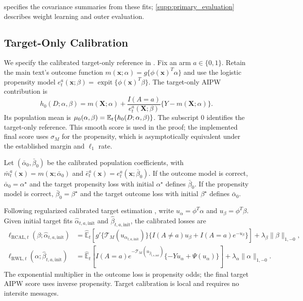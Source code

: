 \documentclass[12pt]{article}
\providecommand{\En}{\widehat{\mathbb E}}
\begin{document}
 specifies the covariance summaries from these fits; \cref{supp:primary_evaluation} describes weight learning and outer evaluation.

\subsection{Target-Only Calibration}\label{supp:target_only_anchor}

We specify the calibrated target-only reference in . Fix an arm $a\in\{0,1\}$. Retain the main text's outcome function $m(\boldsymbol x;\alpha)=g\{\phi(\boldsymbol x)^T\alpha\}$ and use the logistic propensity model $e_t^a(\boldsymbol x;\beta)=\operatorname{expit}\{\phi(\boldsymbol x)^T\beta\}$.
The target-only AIPW contribution is
\[
h_0(D;\alpha,\beta)
=m(\boldsymbol X;\alpha)+\frac{I(A=a)}{e_t^a(\boldsymbol X;\beta)}
\{Y-m(\boldsymbol X;\alpha)\}.
\]
Its population mean is $\mu_0(\alpha,\beta)=\mathbb{E}_t\{h_0(D;\alpha,\beta)\}$. The subscript $0$ identifies the target-only reference. This smooth score is used in the proof; the implemented final score uses $\sigma_M$ for the propensity, which is asymptotically equivalent under the established margin and $\ell_1$ rate.

Let $(\bar\alpha_0,\bar\beta_0)$ be the calibrated population coefficients, with $\bar m_t^a(\boldsymbol x)=m(\boldsymbol x;\bar\alpha_0)$ and $\bar e_t^a(\boldsymbol x)=e_t^a(\boldsymbol x;\bar\beta_0)$. If the outcome model is correct, $\bar\alpha_0=\alpha^\star$ and the target propensity loss with initial $\alpha^\star$ defines $\bar\beta_0$. If the propensity model is correct, $\bar\beta_0=\beta^\star$ and the target outcome loss with initial $\beta^\star$ defines $\bar\alpha_0$.

Following regularized calibrated target estimation \citep{tan2020model,smucler2019unifying,hou2025efficient}, write $u_\alpha=\phi^T\alpha$ and $u_\beta=\phi^T\beta$. Given initial target fits $\widehat\alpha_{t,a,\mathrm{init}}$ and $\widehat\beta_{t,a,\mathrm{init}}$, the calibrated losses are
\begin{equation}\label{eq:target_calibrated_losses}
\begin{aligned}
\ell_{\mathrm{RCAL},t}(\beta;\widehat\alpha_{t,a,\mathrm{init}})
&=\En_t\left[g'\{\mathcal T_M(u_{\widehat\alpha_{t,a,\mathrm{init}}})\}
\{I(A\ne a)u_\beta+I(A=a) e^{-u_\beta}\}\right]
+\lambda_\beta\|\beta\|_{1,-0},\\
\ell_{\mathrm{RWL},t}(\alpha;\widehat\beta_{t,a,\mathrm{init}})
&=\En_t\left[I(A=a) e^{-\mathcal T_M(u_{\widehat\beta_{t,a,\mathrm{init}}})}
\{-Yu_\alpha+\Psi(u_\alpha)\}\right]
+\lambda_\alpha\|\alpha\|_{1,-0}.
\end{aligned}
\end{equation}
The exponential multiplier in the outcome loss is propensity odds; the final target AIPW score uses inverse propensity. Target calibration is local and requires no intersite messages.
\end{document}
